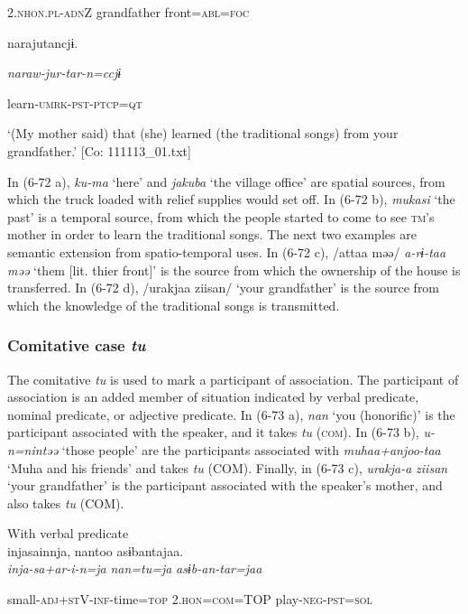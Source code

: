       2.\textsc{nhon}.\textsc{pl}-\textsc{adn}Z    grandfather  front=\textsc{abl}=\textsc{foc}

      narajutancjɨ.

      \textit{naraw-jur-tar-n=ccjɨ}

      learn-\textsc{umrk}-\textsc{pst}-\textsc{ptcp}=\textsc{qt}

\glt ‘(My mother said) that (she) learned (the traditional songs) from your grandfather.’ [Co: 111113\_01.txt]
\z

In (6-72 a), \textit{ku-ma} ‘here’ and \textit{jakuba} ‘the village office’ are spatial sources, from which the truck loaded with relief supplies would set off. In (6-72 b), \textit{mukasi} ‘the past’ is a temporal source, from which the people started to come to see \textsc{tm}’s mother in order to learn the traditional songs. The next two examples are semantic extension from spatio-temporal uses. In (6-72 c), /attaa məə/ \textit{a-rɨ-taa} \textit{məə} ‘them [lit. thier front]’ is the source from which the ownership of the house is transferred. In (6-72 d), /urakjaa ziisan/ ‘your grandfather’ is the source from which the knowledge of the traditional songs is transmitted.

\subsubsection{ Comitative case \textit{tu}}

The comitative \textit{tu} is used to mark a participant of association. The participant of association is an added member of situation indicated by verbal predicate, nominal predicate, or adjective predicate. In (6-73 a), \textit{nan} ‘you (honorific)’ is the participant associated with the speaker, and it takes \textit{tu} (\textsc{com}). In (6-73 b), \textit{u-n=nintəə} ‘those people’ are the participants associated with \textit{muhaa+anjoo-taa} ‘Muha and his friends’ and takes \textit{tu} (COM). Finally, in (6-73 c), \textit{urakja-a} \textit{ziisan} ‘your grandfather’ is the participant associated with the speaker’s mother, and also takes \textit{tu} (COM).

\ea\label{ex:6-73}
\ea With verbal predicate\\
{\TM}
\gll  injasainnja,  nantoo  asɨbantajaa.\\

      \textit{inja-sa+ar-i-n=ja}  \textit{nan=tu=ja}  \textit{asɨb-an-tar=jaa}

      small-\textsc{adj}+\textsc{st}V-\textsc{inf}-time=\textsc{top}  2.\textsc{hon}=\textsc{com}=TOP  play-\textsc{neg}-\textsc{pst}=\textsc{sol}

